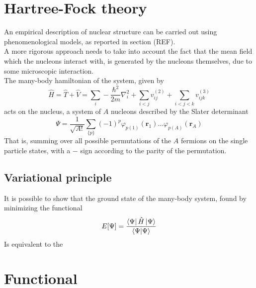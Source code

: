 \section{Hartree-Fock theory}
An empirical description of nuclear structure can be carried out using phenomenological models, as reported in section (REF).
\\A more rigorous approach needs to take into account the fact that the mean field which the nucleons interact with, is generated by the nucleons themselves, due to some microscopic interaction.
\\The many-body hamiltonian of the system, given by
\begin{equation}
    \label{eq:mb_hamiltonian}
    \hat H = \hat T + \hat V = \sum_i -\frac{\hbar^2}{2m}\nabla^2_i + \sum_{i<j} v^{(2)}_{ij} + \sum_{i<j<k} v^{(3)}_{ijk }
\end{equation}
acts on the nucleus, a system of $A$ nucleons described by the Slater determinant
\begin{equation}
    \label{eq:slater_formula}
    \Psi = \frac{1}{\sqrt {A!}} \sum_{\{p\}} (-1)^{p}  \varphi_{p(1)}(\bm r_1)\ldots \varphi_{p(A)}(\bm r_A)
\end{equation}
That is, summing over all possible permutations of the $A$ fermions on the single particle states, with a $-$ sign according to the parity of the permutation.
\subsection{Variational principle}
It is possible to show \cite{ring2004nuclear} that the ground state of the many-body system, found by minimizing the functional
\begin{equation}
    \label{eq:functional_hf}
    E[\Psi] = \frac{\bra{\Psi} \hat H \ket{\Psi}}{\bra{\Psi} \ket{\Psi}}
\end{equation}
Is equivalent to the 




\section{Functional}

